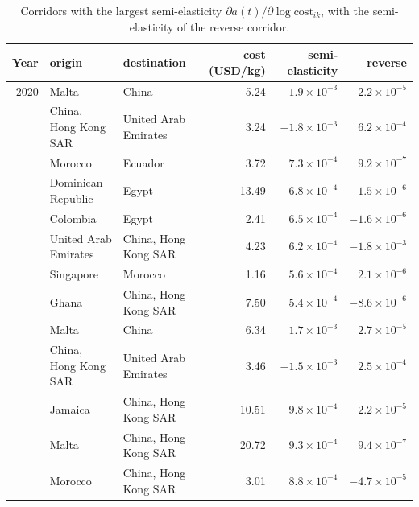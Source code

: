 \documentclass[12pt]{article}
\begin{document}
\begin{table}[h]
\caption{Corridors with the largest semi-elasticity $\partial a(t)/\partial\log\mathrm{cost}_{ik}$, with the semi-elasticity of the reverse corridor.}\label{tab:senscorr}
\centering\footnotesize
\begin{tabular}{rllrrr}
\toprule
Year & origin & destination & cost (USD/kg) & semi-elasticity & reverse\\
\midrule
2020 & Malta & China & 5.24 & $1.9\times10^{-3}$ & $2.2\times10^{-5}$\\
 & China, Hong Kong SAR & United Arab Emirates & 3.24 & $-1.8\times10^{-3}$ & $6.2\times10^{-4}$\\
 & Morocco & Ecuador & 3.72 & $7.3\times10^{-4}$ & $9.2\times10^{-7}$\\
 & Dominican Republic & Egypt & 13.49 & $6.8\times10^{-4}$ & $-1.5\times10^{-6}$\\
 & Colombia & Egypt & 2.41 & $6.5\times10^{-4}$ & $-1.6\times10^{-6}$\\
 & United Arab Emirates & China, Hong Kong SAR & 4.23 & $6.2\times10^{-4}$ & $-1.8\times10^{-3}$\\
 & Singapore & Morocco & 1.16 & $5.6\times10^{-4}$ & $2.1\times10^{-6}$\\
 & Ghana & China, Hong Kong SAR & 7.50 & $5.4\times10^{-4}$ & $-8.6\times10^{-6}$\\
\addlinespace
2021 & Malta & China & 6.34 & $1.7\times10^{-3}$ & $2.7\times10^{-5}$\\
 & China, Hong Kong SAR & United Arab Emirates & 3.46 & $-1.5\times10^{-3}$ & $2.5\times10^{-4}$\\
 & Jamaica & China, Hong Kong SAR & 10.51 & $9.8\times10^{-4}$ & $2.2\times10^{-5}$\\
 & Malta & China, Hong Kong SAR & 20.72 & $9.3\times10^{-4}$ & $9.4\times10^{-7}$\\
 & Morocco & China, Hong Kong SAR & 3.01 & $8.8\times10^{-4}$ & $-4.7\times10^{-5}$\\
\bottomrule
\end{tabular}
\end{table}
\end{document}
